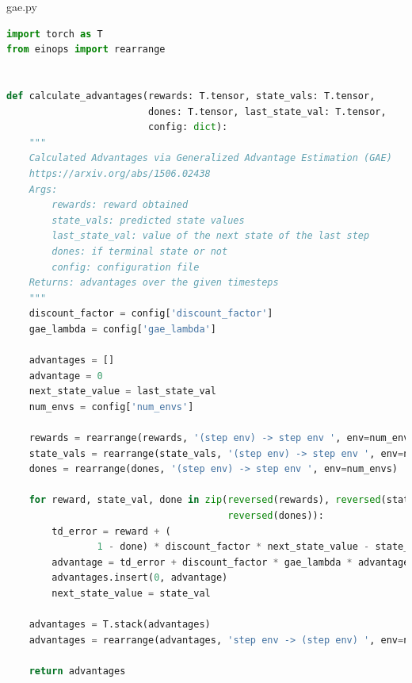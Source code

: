 \documentclass{article}
\begin{document}
gae.py
\begin{lstlisting}[language=Python]
import torch as T
from einops import rearrange


def calculate_advantages(rewards: T.tensor, state_vals: T.tensor,
                         dones: T.tensor, last_state_val: T.tensor,
                         config: dict):
    """
    Calculated Advantages via Generalized Advantage Estimation (GAE)
    https://arxiv.org/abs/1506.02438
    Args:
        rewards: reward obtained
        state_vals: predicted state values
        last_state_val: value of the next state of the last step
        dones: if terminal state or not
        config: configuration file
    Returns: advantages over the given timesteps
    """
    discount_factor = config['discount_factor']
    gae_lambda = config['gae_lambda']

    advantages = []
    advantage = 0
    next_state_value = last_state_val
    num_envs = config['num_envs']

    rewards = rearrange(rewards, '(step env) -> step env ', env=num_envs)
    state_vals = rearrange(state_vals, '(step env) -> step env ', env=num_envs)
    dones = rearrange(dones, '(step env) -> step env ', env=num_envs)

    for reward, state_val, done in zip(reversed(rewards), reversed(state_vals),
                                       reversed(dones)):
        td_error = reward + (
                1 - done) * discount_factor * next_state_value - state_val
        advantage = td_error + discount_factor * gae_lambda * advantage
        advantages.insert(0, advantage)
        next_state_value = state_val

    advantages = T.stack(advantages)
    advantages = rearrange(advantages, 'step env -> (step env) ', env=num_envs)

    return advantages
\end{lstlisting}
\newpage
\end{document}
